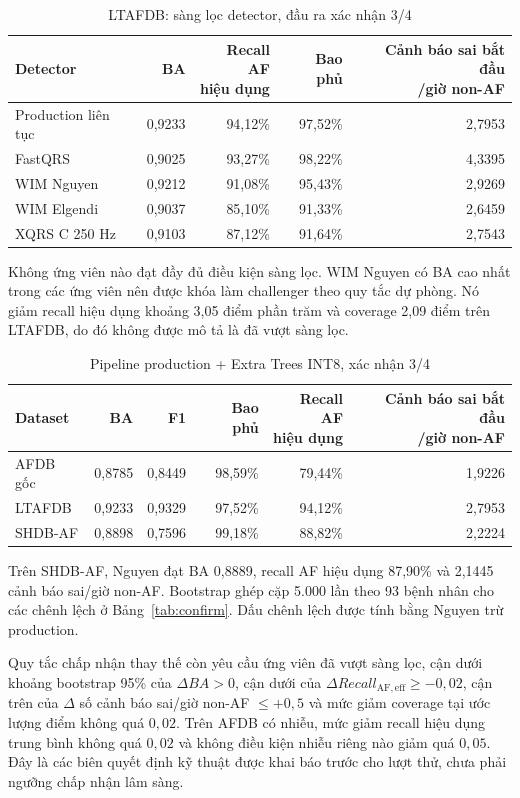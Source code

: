 \documentclass[12pt,a4paper,oneside]{report}
\begin{document}
\begin{table}[H]
\centering\small
\caption{LTAFDB: sàng lọc detector, đầu ra xác nhận 3/4}
\begin{tabular}{lrrrr}
\toprule Detector & BA & \shortstack{Recall AF\\hiệu dụng} & Bao phủ & \shortstack{Cảnh báo sai bắt đầu\\/giờ non-AF}\\\midrule
Production liên tục & 0,9233 & 94,12\% & 97,52\% & 2,7953\\
FastQRS & 0,9025 & 93,27\% & 98,22\% & 4,3395\\
WIM Nguyen & 0,9212 & 91,08\% & 95,43\% & 2,9269\\
WIM Elgendi & 0,9037 & 85,10\% & 91,33\% & 2,6459\\
XQRS C 250 Hz & 0,9103 & 87,12\% & 91,64\% & 2,7543\\
\bottomrule
\end{tabular}
\end{table}
Không ứng viên nào đạt đầy đủ điều kiện sàng lọc. WIM Nguyen có BA cao nhất trong các ứng viên nên được khóa làm challenger theo quy tắc dự phòng. Nó giảm recall hiệu dụng khoảng 3,05 điểm phần trăm và coverage 2,09 điểm trên LTAFDB, do đó không được mô tả là đã vượt sàng lọc.

\begin{table}[H]
\centering\small
\caption{Pipeline production + Extra Trees INT8, xác nhận 3/4}
\begin{tabular}{lrrrrr}
\toprule Dataset & BA & F1 & Bao phủ & \shortstack{Recall AF\\hiệu dụng} & \shortstack{Cảnh báo sai bắt đầu\\/giờ non-AF}\\\midrule
AFDB gốc & 0,8785 & 0,8449 & 98,59\% & 79,44\% & 1,9226\\
LTAFDB & 0,9233 & 0,9329 & 97,52\% & 94,12\% & 2,7953\\
SHDB-AF & 0,8898 & 0,7596 & 99,18\% & 88,82\% & 2,2224\\
\bottomrule
\end{tabular}
\end{table}
Trên SHDB-AF, Nguyen đạt BA 0,8889, recall AF hiệu dụng 87,90\% và 2,1445 cảnh báo sai/giờ non-AF. Bootstrap ghép cặp 5.000 lần theo 93 bệnh nhân cho các chênh lệch ở Bảng~\ref{tab:confirm}. Dấu chênh lệch được tính bằng Nguyen trừ production.

Quy tắc chấp nhận thay thế còn yêu cầu ứng viên đã vượt sàng lọc, cận dưới khoảng bootstrap 95\% của $\Delta BA>0$, cận dưới của $\Delta Recall_{\mathrm{AF,eff}}\geq-0{,}02$, cận trên của $\Delta$ số cảnh báo sai/giờ non-AF $\leq+0{,}5$ và mức giảm coverage tại ước lượng điểm không quá $0{,}02$. Trên AFDB có nhiễu, mức giảm recall hiệu dụng trung bình không quá $0{,}02$ và không điều kiện nhiễu riêng nào giảm quá $0{,}05$. Đây là các biên quyết định kỹ thuật được khai báo trước cho lượt thử, chưa phải ngưỡng chấp nhận lâm sàng.
\end{document}
